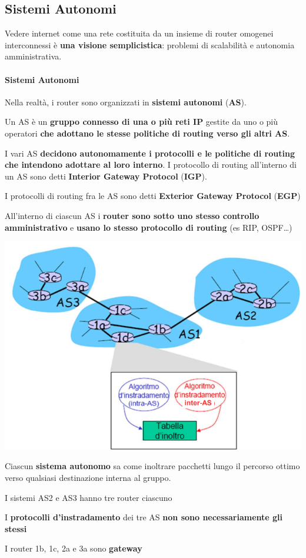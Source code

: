 \documentclass[10pt]{article}
\begin{document}
\subsection{Sistemi Autonomi}
Vedere internet come una rete costituita da un insieme di router omogenei interconnessi è \textbf{una visione semplicistica}: problemi di scalabilità e autonomia amministrativa.
\paragraph{Sistemi Autonomi} Nella realtà, i router sono organizzati in \textbf{sistemi autonomi} (\textbf{AS}).
\begin{list}{}{}
	\item Un AS è un \textbf{gruppo connesso di una o più reti IP} gestite da uno o più operatori \textbf{che adottano le stesse politiche di routing verso gli altri AS}.
	\item I vari AS \textbf{decidono autonomamente i protocolli e le politiche di routing che intendono adottare al loro interno}. I protocollo di routing all'interno di un AS sono detti \textbf{Interior Gateway Protocol} (\textbf{IGP}).
	\item I protocolli di routing fra le AS sono detti \textbf{Exterior Gateway Protocol} (\textbf{EGP})
	\item All'interno di ciascun AS i \textbf{router sono sotto uno stesso controllo amministrativo} e \textbf{usano lo stesso protocollo di routing} (es RIP, OSPF\ldots)
\end{list}
\begin{center}
\includegraphics[scale=0.7]{asinterconn.png}
\end{center}
Ciascun \textbf{sistema autonomo}  sa come inoltrare pacchetti lungo il percorso ottimo verso qualsiasi destinazione interna al gruppo.
\begin{list}{}{}
	\item I sistemi AS2 e AS3 hanno tre router ciascuno
	\item I \textbf{protocolli d'instradamento} dei tre AS \textbf{non sono necessariamente gli stessi}
	\item I router 1b, 1c, 2a e 3a sono \textbf{gateway}
\end{list}
\end{document}
